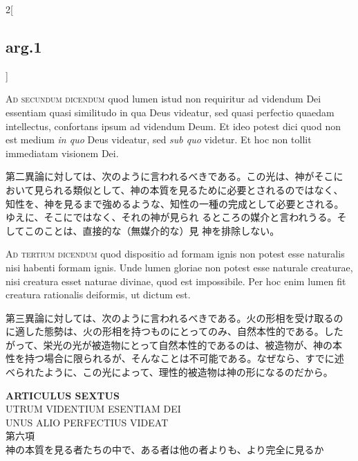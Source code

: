 \documentclass[paper=a4paper,fontsize=10pt,jafontsize=9pt,titlepage]{jlreq}
\begin{document}
\begin{paracol}{2}[\subsection{arg.1}]
\switchcolumn*[\subsection{ad.2}]

{\scshape Ad secundum dicendum} quod lumen istud non requiritur ad videndum
Dei essentiam quasi similitudo in qua Deus videatur, sed quasi
perfectio quaedam intellectus, confortans ipsum ad videndum Deum. Et
ideo potest dici quod non est medium {\itshape in quo} Deus videatur, sed
{\itshape sub quo} videtur. Et hoc non tollit immediatam visionem Dei.

\switchcolumn

第二異論に対しては、次のように言われるべきである。この光は、神がそこに
おいて見られる類似として、神の本質を見るために必要とされるのではなく、
知性を、神を見るまで強めるような、知性の一種の完成として必要とされる。
ゆえに、そこにではなく、それの神が見られ
るところの媒介と言われうる。そしてこのことは、直接的な（無媒介的な）見
神を排除しない。

\switchcolumn*[\subsection{ad.3}]

{\scshape Ad tertium dicendum} quod dispositio ad formam ignis non potest
esse naturalis nisi habenti formam ignis. Unde lumen gloriae non
potest esse naturale creaturae, nisi creatura esset naturae divinae,
quod est impossibile. Per hoc enim lumen fit creatura rationalis
deiformis, ut dictum est.

\switchcolumn

第三異論に対しては、次のように言われるべきである。火の形相を受け取るの
に適した態勢は、火の形相を持つものにとってのみ、自然本性的である。した
がって、栄光の光が被造物にとって自然本性的であるのは、被造物が、神の本
性を持つ場合に限られるが、そんなことは不可能である。なぜなら、すでに述
べられたように、この光によって、理性的被造物は神の形になるのだから。

\end{paracol}

\newpage
{}

\begin{center}
 {\Large {\bfseries ARTICULUS SEXTUS}}\\
{\large UTRUM VIDENTIUM ESENTIAM DEI\\UNUS ALIO PERFECTIUS VIDEAT}\\
{\large 第六項\\
神の本質を見る者たちの中で、ある者は他の者よりも、より完全に見るか}
\end{center}
\end{document}
